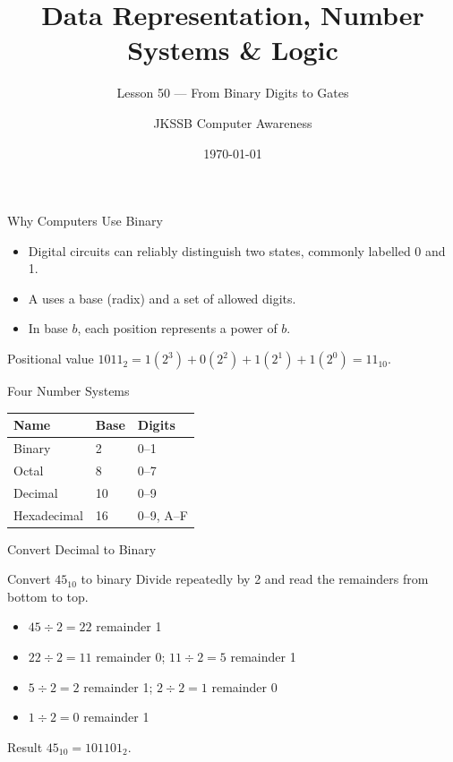 \documentclass[aspectratio=169]{beamer}
\title{Data Representation, Number Systems \& Logic}
\subtitle{Lesson 50 --- From Binary Digits to Gates}
\author{JKSSB Computer Awareness}
\date{\today}
\begin{document}
\frame{\titlepage}

\begin{frame}{Why Computers Use Binary}
  \begin{itemize}
    \item Digital circuits can reliably distinguish two states, commonly
      labelled 0 and 1.
    \item A  uses a base (radix) and a set of allowed
      digits.
    \item In base $b$, each position represents a power of $b$.
  \end{itemize}
  \begin{block}{Positional value}
    $1011_2 = 1(2^3)+0(2^2)+1(2^1)+1(2^0)=11_{10}$.
  \end{block}
\end{frame}

\begin{frame}{Four Number Systems}
  \begin{center}
    \begin{tabular}{lll}
      \toprule
      \textbf{Name} & \textbf{Base} & \textbf{Digits} \\
      \midrule
      Binary & 2 & 0--1 \\
      Octal & 8 & 0--7 \\
      Decimal & 10 & 0--9 \\
      Hexadecimal & 16 & 0--9, A--F \\
      \bottomrule
    \end{tabular}
  \end{center}
  \vspace{0.3cm}
\end{frame}

\begin{frame}{Convert Decimal to Binary}
  \begin{exampleblock}{Convert $45_{10}$ to binary}
    Divide repeatedly by 2 and read the remainders from bottom to top.
  \end{exampleblock}
  \begin{itemize}
    \item $45 \div 2 = 22$ remainder 1
    \item $22 \div 2 = 11$ remainder 0; $11 \div 2 = 5$ remainder 1
    \item $5 \div 2 = 2$ remainder 1; $2 \div 2 = 1$ remainder 0
    \item $1 \div 2 = 0$ remainder 1
  \end{itemize}
  \begin{alertblock}{Result}
    $45_{10}=101101_2$.
  \end{alertblock}
\end{frame}
\end{document}
